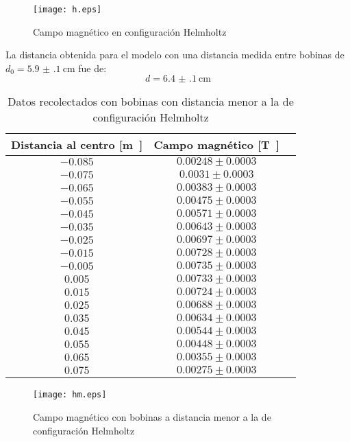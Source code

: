 \documentclass[12pt,a4paper]{article}
\begin{document}
\begin{figure}[H]
  \centering
   \texttt{[image: h.eps]}
\caption{Campo magnético en configuración Helmholtz}
  \label{hplot}
\end{figure}


La distancia obtenida para el modelo con una distancia medida entre bobinas de $d_0 = \SI{5.9(1)}{\centi\meter}$ fue de: $$d = \SI{6.4(1)}{\centi\meter}$$


\begin{table}[H]
 \centering
 \begin{tabular}{|c|c|c}
Distancia al centro [\si\meter] & Campo magnético [\si\tesla] \\
\hline
$ -0.085 $ & $ 0.00248 \pm 0.0003 $ \\ 
$ -0.075 $ & $ 0.0031 \pm 0.0003 $ \\ 
$ -0.065 $ & $ 0.00383 \pm 0.0003 $ \\ 
$ -0.055 $ & $ 0.00475 \pm 0.0003 $ \\ 
$ -0.045 $ & $ 0.00571 \pm 0.0003 $ \\ 
$ -0.035 $ & $ 0.00643 \pm 0.0003 $ \\ 
$ -0.025 $ & $ 0.00697 \pm 0.0003 $ \\ 
$ -0.015 $ & $ 0.00728 \pm 0.0003 $ \\ 
$ -0.005 $ & $ 0.00735 \pm 0.0003 $ \\ 
$ 0.005 $ & $ 0.00733 \pm 0.0003 $ \\ 
$ 0.015 $ & $ 0.00724 \pm 0.0003 $ \\ 
$ 0.025 $ & $ 0.00688 \pm 0.0003 $ \\ 
$ 0.035 $ & $ 0.00634 \pm 0.0003 $ \\ 
$ 0.045 $ & $ 0.00544 \pm 0.0003 $ \\ 
$ 0.055 $ & $ 0.00448 \pm 0.0003 $ \\ 
$ 0.065 $ & $ 0.00355 \pm 0.0003 $ \\ 
$ 0.075 $ & $ 0.00275 \pm 0.0003 $ \\ 

 \end{tabular}
\caption{Datos recolectados con bobinas con distancia menor a la de configuración Helmholtz} 
 \end{table}

\begin{figure}[H]
  \centering
   \texttt{[image: hm.eps]}
\caption{Campo magnético con bobinas a distancia menor a la de configuración Helmholtz}
  \label{hmplot}
\end{figure}
\end{document}
